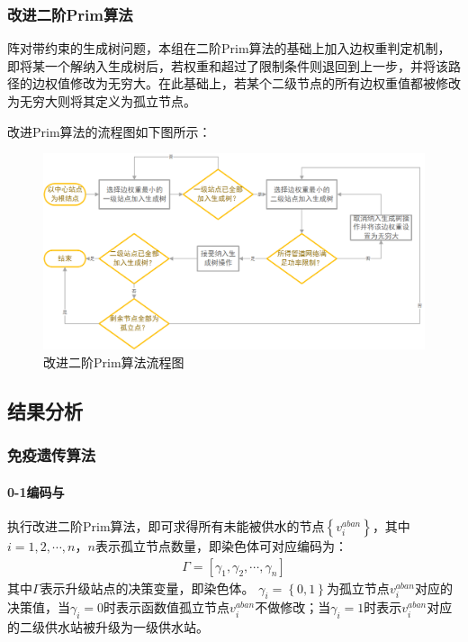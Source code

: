 \documentclass{whutmod}
\begin{document}
    	\subsubsection{改进二阶Prim算法}
    	阵对带约束的生成树问题，本组在二阶Prim算法的基础上加入边权重判定机制，即将某一个解纳入生成树后，若权重和超过了限制条件则退回到上一步，并将该路径的边权值修改为无穷大。在此基础上，若某个二级节点的所有边权重值都被修改为无穷大则将其定义为孤立节点。
    	
    	改进Prim算法的流程图如下图所示：
        \begin{figure}[H]
        	\centering
        	\includegraphics[width=\textwidth]{figures/a3.png}
        	\caption{改进二阶Prim算法流程图}\label{asd}
        \end{figure}
        
    		

  		\subsection{结果分析}
  	\subsubsection{免疫遗传算法}
  	\paragraph{0-1编码与}
  	执行改进二阶Prim算法，即可求得所有未能被供水的节点$\left \{ v_i^{aban} \right \}$，其中$i=1,2,\cdots,n$，$n$表示孤立节点数量，即染色体可对应编码为：
  		\begin{gather}
  		\Gamma =[\gamma_1,\gamma_2,\cdots, \gamma_n]
  		\end{gather}
    其中$\Gamma$表示升级站点的决策变量，即染色体。 $\gamma_i=\left \{ 0,1 \right \}$为孤立节点$v_i^{aban}$对应的决策值，当$\gamma_i=0$时表示函数值孤立节点$v_i^{aban}$不做修改；当$\gamma_i=1$时表示$v_i^{aban}$对应的二级供水站被升级为一级供水站。
\end{document}
